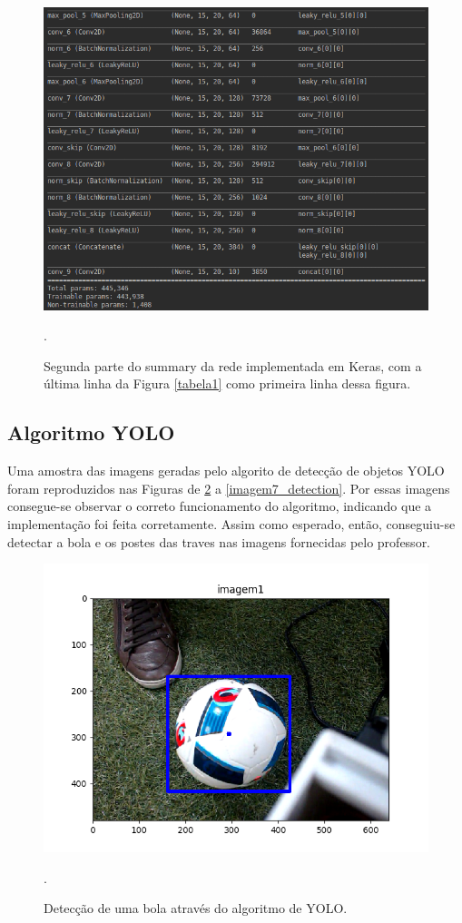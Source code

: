 \documentclass[conference]{IEEEtran}
\begin{document}
\begin{figure}[htbp]
\centering
\centerline{\includegraphics[scale=0.35]{imagens/tabela2.png}}
\caption{Segunda parte do summary da rede implementada em Keras, com a última linha da Figura \ref{tabela1} como primeira linha dessa figura.}.
\label{tabela2}
\end{figure} 

\subsection{Algoritmo YOLO}
Uma amostra das imagens geradas pelo algorito de detecção de objetos YOLO foram reproduzidos nas Figuras de \ref{imagem1_detection} a \ref{imagem7_detection}. Por essas imagens consegue-se observar o correto funcionamento do algoritmo, indicando que a implementação foi feita corretamente. Assim como esperado, então, conseguiu-se detectar a bola e os postes das traves nas imagens fornecidas pelo professor.

\begin{figure}[htbp]
\centering
\centerline{\includegraphics[scale=0.5]{imagens/imagem1_detection.png}}
\caption{Detecção de uma bola através do algoritmo de YOLO.}.
\label{imagem1_detection}
\end{figure}
\end{document}
